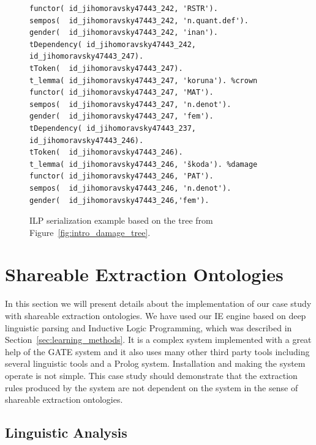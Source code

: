 \begin{figure}
\begin{verbatim}
functor( id_jihomoravsky47443_242, 'RSTR').
sempos(  id_jihomoravsky47443_242, 'n.quant.def').
gender(  id_jihomoravsky47443_242, 'inan').
tDependency( id_jihomoravsky47443_242, id_jihomoravsky47443_247).
tToken(  id_jihomoravsky47443_247).
t_lemma( id_jihomoravsky47443_247, 'koruna'). %crown
functor( id_jihomoravsky47443_247, 'MAT').
sempos(  id_jihomoravsky47443_247, 'n.denot').
gender(  id_jihomoravsky47443_247, 'fem').
tDependency( id_jihomoravsky47443_237, id_jihomoravsky47443_246).
tToken(  id_jihomoravsky47443_246).
t_lemma( id_jihomoravsky47443_246, 'škoda'). %damage
functor( id_jihomoravsky47443_246, 'PAT').
sempos(  id_jihomoravsky47443_246, 'n.denot').
gender(  id_jihomoravsky47443_246,'fem').
\end{verbatim}
\caption{ILP serialization example based on the tree from Figure~\ref{fig:intro_damage_tree}.}
\label{fig:ilp_serialization}
\end{figure}








\clearpage


\section{Shareable Extraction Ontologies} \label{sec:onto_implement}
\graphicspath{{../img/ch70/}}


In this section we will present details about the implementation of our case study with shareable extraction ontologies.  We have used our IE engine based on deep linguistic parsing and Inductive Logic Programming, which was described in Section~\ref{sec:learning_methods}. It is a complex system implemented with a great help of the GATE system and it also uses many other third party tools including several linguistic tools and a Prolog system. Installation and making the system operate is not simple. This case study should demonstrate that the extraction rules produced by the system are not dependent on the system in the sense of shareable extraction ontologies.




\subsection{Linguistic Analysis}



